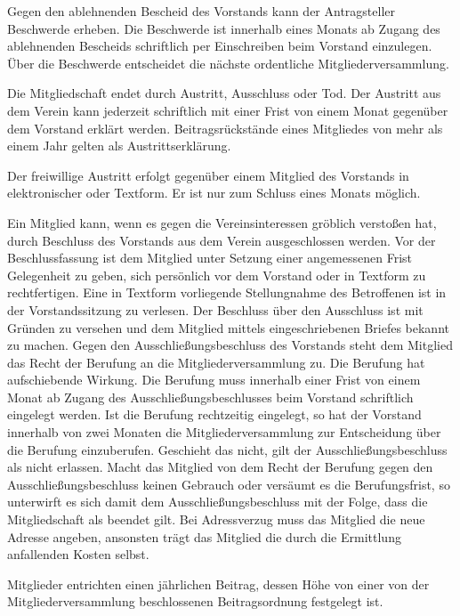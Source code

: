 \documentclass[parskip]{scrartcl}
\begin{document}
\begin{contract}
Gegen den ablehnenden Bescheid des Vorstands kann der Antragsteller Beschwerde erheben. Die Beschwerde ist innerhalb eines Monats ab Zugang des ablehnenden Bescheids schriftlich per Einschreiben beim Vorstand einzulegen. Über die Beschwerde entscheidet die nächste ordentliche Mitgliederversammlung.


Die Mitgliedschaft endet durch Austritt, Ausschluss oder Tod. Der Austritt aus dem Verein kann jederzeit schriftlich mit einer Frist von einem Monat gegenüber dem Vorstand erklärt werden. Beitragsrückstände eines Mitgliedes von mehr als einem Jahr gelten als Austrittserklärung.

Der freiwillige Austritt erfolgt gegenüber einem Mitglied des Vorstands in elektronischer oder Textform. Er ist nur zum Schluss eines Monats möglich.

Ein Mitglied kann, wenn es gegen die Vereinsinteressen gröblich verstoßen hat, durch Beschluss des Vorstands aus dem Verein ausgeschlossen werden. Vor der Beschlussfassung ist dem Mitglied unter Setzung einer angemessenen Frist Gelegenheit zu geben, sich persönlich vor dem Vorstand oder in Textform zu rechtfertigen. Eine in Textform vorliegende Stellungnahme des Betroffenen ist in der Vorstandssitzung zu verlesen. Der Beschluss über den Ausschluss ist mit Gründen zu versehen und dem Mitglied mittels eingeschriebenen Briefes bekannt zu machen. Gegen den Ausschließungsbeschluss des Vorstands steht dem Mitglied das Recht der Berufung an die Mitgliederversammlung zu. Die Berufung hat aufschiebende Wirkung. Die Berufung muss innerhalb einer Frist von einem Monat ab Zugang des Ausschließungsbeschlusses beim Vorstand schriftlich eingelegt werden. Ist die Berufung rechtzeitig eingelegt, so hat der Vorstand innerhalb von zwei Monaten die Mitgliederversammlung zur Entscheidung über die Berufung einzuberufen. Geschieht das nicht, gilt der Ausschließungsbeschluss als nicht erlassen. Macht das Mitglied von dem Recht der Berufung gegen den Ausschließungsbeschluss keinen Gebrauch oder versäumt es die Berufungsfrist, so unterwirft es sich damit dem Ausschließungsbeschluss mit der Folge, dass die Mitgliedschaft als beendet gilt. Bei Adressverzug muss das Mitglied die neue Adresse angeben, ansonsten trägt das Mitglied die durch die Ermittlung anfallenden Kosten selbst. 


Mitglieder entrichten einen jährlichen Beitrag, dessen Höhe von einer von der Mitgliederversammlung beschlossenen Beitragsordnung festgelegt ist.


\end{contract}
\end{document}
